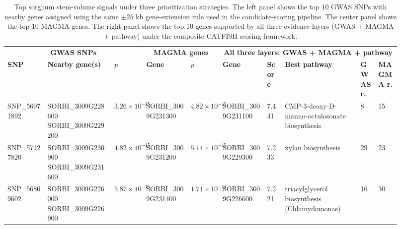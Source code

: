 \documentclass[unnumsec,webpdf,contemporary,large]{oup-authoring-template}%
\theoremstyle{thmstyleone}%
\theoremstyle{thmstyletwo}%
\theoremstyle{thmstylethree}%
\begin{document}
\begin{table}[!tp]
\centering
\caption{Top sorghum stem-volume signals under three prioritization strategies. The left panel shows the top 10 GWAS SNPs with nearby genes assigned using the same $\pm 25$ kb gene-extension rule used in the candidate-scoring pipeline. The center panel shows the top 10 MAGMA genes. The right panel shows the top 10 genes supported by all three evidence layers (GWAS + MAGMA + pathway) under the composite CATFISH scoring framework.}
\label{tab:sap_stem_volume_top10_layers}
\tiny
\setlength{\tabcolsep}{1.5pt}
\renewcommand{\arraystretch}{1.08}

\begin{tabular}{p{0.096\linewidth} p{0.154\linewidth} p{0.072\linewidth}
                p{0.106\linewidth} p{0.072\linewidth}
                p{0.106\linewidth} p{0.043\linewidth} p{0.173\linewidth} p{0.043\linewidth} p{0.053\linewidth}}
\hline
\multicolumn{3}{c}{\textbf{GWAS SNPs}} &
\multicolumn{2}{c}{\textbf{MAGMA genes}} &
\multicolumn{5}{c}{\textbf{All three layers: GWAS + MAGMA + pathway}} \\
\cline{1-3} \cline{4-5} \cline{6-10}
\textbf{SNP} & \textbf{Nearby gene(s)} & \textbf{$p$} &
\textbf{Gene} & \textbf{$p$} &
\textbf{Gene} & \textbf{Score} & \textbf{Best pathway} & \textbf{GWAS r.} & \textbf{MAGMA r.} \\
\hline

SNP\_56971892 
& \makecell[l]{SORBI\_3009G228600\\SORBI\_3009G229200} 
& $3.26{\times}10^{-15}$ 
& SORBI\_3009G231300 & $4.82{\times}10^{-15}$ 
& SORBI\_3009G231100 & 7.441 
& CMP-3-deoxy-D-manno-octulosonate biosynthesis 
& 8 & 15 \\

SNP\_57127820 
& \makecell[l]{SORBI\_3009G230900\\SORBI\_3009G231600} 
& $4.82{\times}10^{-15}$ 
& SORBI\_3009G231200 & $5.14{\times}10^{-15}$ 
& SORBI\_3009G229300 & 7.233 
& xylan biosynthesis 
& 29 & 23 \\

SNP\_56809602 
& \makecell[l]{SORBI\_3009G226000\\SORBI\_3009G226900} 
& $5.87{\times}10^{-15}$ 
& SORBI\_3009G231400 & $1.71{\times}10^{-14}$ 
& SORBI\_3009G226600 & 7.221 
& triacylglycerol biosynthesis (Chlamydomonas) 
& 16 & 30 \\


\end{tabular}
\end{table}
\end{document}
